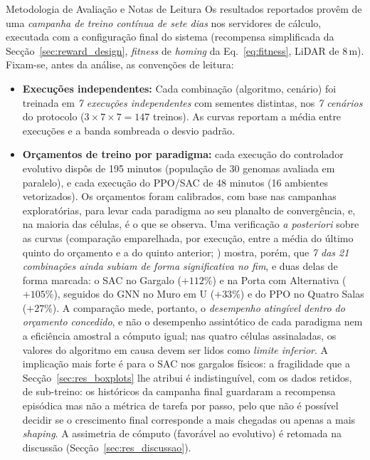 \documentclass[12pt,reqno, twoside]{amsbook}
\makeatletter
\def\section{\@startsection{section}{1}%
      \z@{.5\linespacing\@plus.7\linespacing}{.25\linespacing}%
      {\normalfont\bfseries\flushleft}}
\theoremstyle{plain}
\numberwithin{equation}{chapter}
\numberwithin{section}{chapter}
\numberwithin{table}{chapter}
\numberwithin{figure}{chapter}
\makeatother
\begin{document}
\section{Metodologia de Avaliação e Notas de Leitura}
\label{sec:res_metodologia}
Os resultados reportados provêm de uma \emph{campanha de treino contínua de sete dias} nos servidores de cálculo, executada com a configuração final do sistema (recompensa simplificada da Secção~\ref{sec:reward_design}, \textit{fitness} de \textit{homing} da Eq.~\ref{eq:fitness}, LiDAR de $8$\,m). Fixam-se, antes da análise, as convenções de leitura:
\begin{itemize}
    \item \textbf{Execuções independentes:} Cada combinação (algoritmo, cenário) foi treinada em \emph{7 execuções independentes} com sementes distintas, nos \emph{7 cenários} do protocolo ($3 \times 7 \times 7 = 147$ treinos). As curvas reportam a média entre execuções e a banda sombreada o desvio padrão.
    \item \textbf{Orçamentos de treino por paradigma:} cada execução do controlador evolutivo dispôs de 195 minutos (população de 30 genomas avaliada em paralelo), e cada execução do PPO/SAC de 48 minutos (16 ambientes vetorizados). Os orçamentos foram calibrados, com base nas campanhas exploratórias, para levar cada paradigma ao seu planalto de convergência, e, na maioria das células, é o que se observa. Uma verificação \textit{a posteriori} sobre as curvas (comparação emparelhada, por execução, entre a média do último quinto do orçamento e a do quinto anterior; ) mostra, porém, que \emph{7 das 21 combinações ainda subiam de forma significativa no fim}, e duas delas de forma marcada: o SAC no Gargalo ($+112\%$) e na Porta com Alternativa ($+105\%$), seguidos do GNN no Muro em U ($+33\%$) e do PPO no Quatro Salas ($+27\%$). A comparação mede, portanto, o \emph{desempenho atingível dentro do orçamento concedido}, e não o desempenho assintótico de cada paradigma nem a eficiência amostral a cómputo igual; nas quatro células assinaladas, os valores do algoritmo em causa devem ser lidos como \emph{limite inferior}. A implicação mais forte é para o SAC nos gargalos físicos: a fragilidade que a Secção~\ref{sec:res_boxplots} lhe atribui é indistinguível, com os dados retidos, de sub-treino: os históricos da campanha final guardaram a recompensa episódica mas não a métrica de tarefa por passo, pelo que não é possível decidir se o crescimento final corresponde a mais chegadas ou apenas a mais \textit{shaping}. A assimetria de cómputo (favorável ao evolutivo) é retomada na discussão (Secção~\ref{sec:res_discussao}).

\end{itemize}
\end{document}
